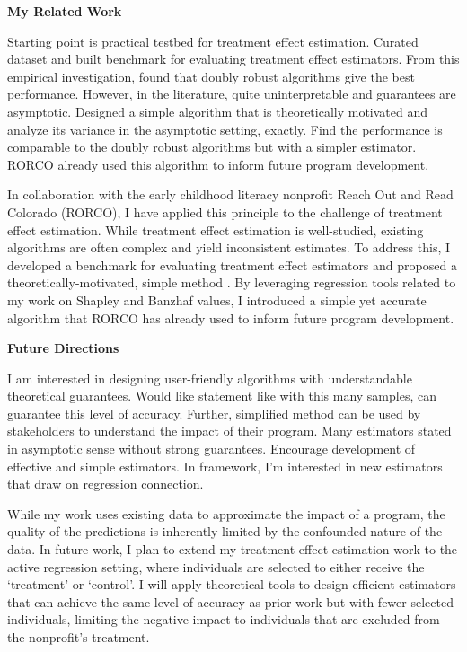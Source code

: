 \documentclass[11pt]{article}
\begin{document}
{{ \large \textbf{My Related Work}}

Starting point is practical testbed for treatment effect estimation.
Curated dataset and built benchmark for evaluating treatment effect estimators.
From this empirical investigation, found that doubly robust algorithms give the best performance.
However, in the literature, quite uninterpretable and guarantees are asymptotic.
Designed a simple algorithm that is theoretically motivated and analyze its variance in the asymptotic setting, exactly.
Find the performance is comparable to the doubly robust algorithms but with a simpler estimator.
RORCO already used this algorithm to inform future program development.

In collaboration with the early childhood literacy nonprofit Reach Out and Read Colorado (RORCO), I have applied this principle to the challenge of treatment effect estimation. While treatment effect estimation is well-studied, existing algorithms are often complex and yield inconsistent estimates. To address this, I developed a benchmark for evaluating treatment effect estimators and proposed a theoretically-motivated, simple method \cite{witter2024benchmarking}. By leveraging regression tools related to my work on Shapley and Banzhaf values, I introduced a simple yet accurate algorithm that RORCO has already used to inform future program development.

{ \large \textbf{Future Directions}}

I am interested in designing user-friendly algorithms with understandable theoretical guarantees.
Would like statement like with this many samples, can guarantee this level of accuracy.
Further, simplified method can be used by stakeholders to understand the impact of their program.
Many estimators stated in asymptotic sense without strong guarantees.
Encourage development of effective and simple estimators.
In framework, I'm interested in new estimators that draw on regression connection.

While my work uses existing data to approximate the impact of a program, the quality of the predictions is inherently limited by the confounded nature of the data. In future work, I plan to extend my treatment effect estimation work to the active regression setting, where individuals are selected to either receive the ‘treatment’ or ‘control’. 
I will apply theoretical tools to design efficient estimators that can achieve the same level of accuracy as prior work but with fewer selected individuals, limiting the negative impact to individuals that are excluded from the nonprofit’s treatment.

}
\end{document}
